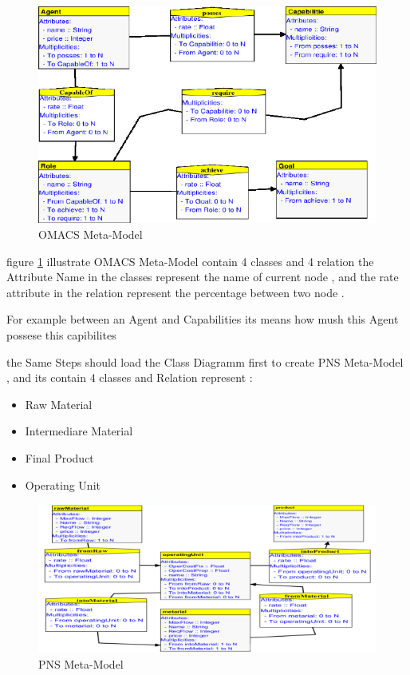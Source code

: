 \begin{figure}[th]
		\centering
 	\includegraphics[scale=1.3]{Chapiter3/img/omacs}
	\caption{\label{fig:OMACS Meta-Model}OMACS Meta-Model}
\end{figure} 
 
figure \ref{fig:OMACS Meta-Model} illustrate OMACS Meta-Model  contain 4 classes 
and 4 relation   
the Attribute Name in the classes represent the name of current node ,
and the rate attribute in the relation represent  the percentage between two node .

For example between an Agent and Capabilities its means how mush this Agent possese this capibilites
 

the Same Steps should load the Class Diagramm first to create PNS Meta-Model , and its contain 4 classes and Relation
represent  : 
\begin{itemize}
	\item Raw Material  
	\item Intermediare Material
	\item Final Product
	\item Operating Unit
\end{itemize}

\begin{figure}[th] 

	\centering
 	\includegraphics[scale=0.8]{Chapiter3/img/a}
	\caption{\label{fig:PNS Meta-Model}PNS Meta-Model}
	
\end{figure} 

